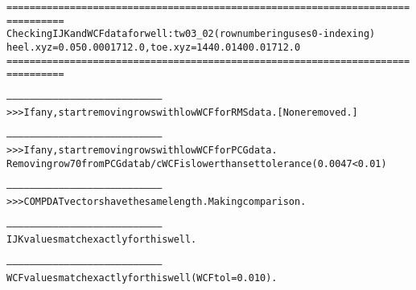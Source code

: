 \begin{alltt}
================================================================================
Checking IJK and WCF data for well: tw03_02 (row numbering uses 0-indexing)
heel.xyz =  0.05 0.000 1712.0, toe.xyz = 1440.0 1400.0 1712.0
================================================================================

--------------------------------------------------------------------------------
>>> If any, start removing rows with low WCF for RMS data. [None removed.]

--------------------------------------------------------------------------------
>>> If any, start removing rows with low WCF for PCG data.
Removing row 70 from PCG data b/c WCF is lower than set tolerance (0.0047 < 0.01)

--------------------------------------------------------------------------------
>>> COMPDAT vectors have the same length. Making comparison.

--------------------------------------------------------------------------------
IJK values match exactly for this well.

--------------------------------------------------------------------------------
WCF values match exactly for this well (WCF tol = 0.010).
\end{alltt}
